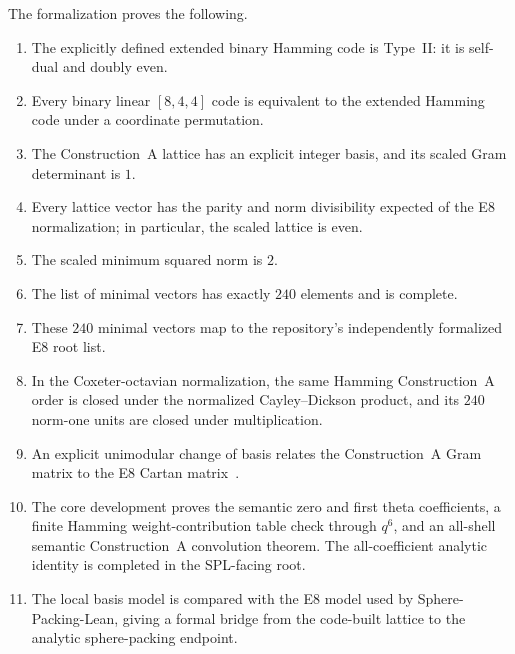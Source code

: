 \documentclass[12pt]{article}
\theoremstyle{definition}
\begin{document}
The formalization proves the following.
\begin{enumerate}
\item The explicitly defined extended binary Hamming code is Type~II: it is
      self-dual and doubly even.

\item Every binary linear $[8,4,4]$ code is equivalent to the extended Hamming
      code under a coordinate permutation.

\item The Construction~A lattice has an explicit integer basis, and its scaled
      Gram determinant is $1$.

\item Every lattice vector has the parity and norm divisibility expected of the
      E8 normalization; in particular, the scaled lattice is even.

\item The scaled minimum squared norm is $2$.

\item The list of minimal vectors has exactly $240$ elements and is complete.

\item These $240$ minimal vectors map to the repository's independently
      formalized E8 root list.

\item In the Coxeter-octavian normalization, the same Hamming Construction~A
      order is closed under the normalized Cayley--Dickson product, and its
      $240$ norm-one units are closed under multiplication.

\item An explicit unimodular change of basis relates the Construction~A Gram
      matrix to the E8 Cartan matrix~\cite{Bourbaki2002,ConwaySloane1999}.

\item The core development proves the semantic zero and first theta
      coefficients, a finite Hamming weight-contribution table check through
      $q^6$, and an all-shell semantic Construction~A convolution theorem.
      The all-coefficient analytic identity is completed in the
      SPL-facing root.

\item The local basis model is compared with the E8 model used by
      Sphere-Packing-Lean, giving a formal bridge from the code-built lattice
      to the analytic sphere-packing endpoint.
\end{enumerate}
\end{document}
